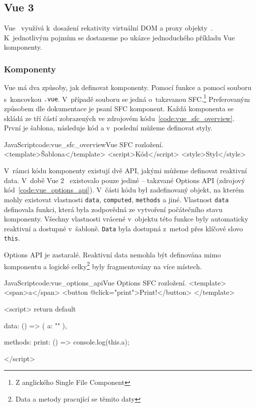 \documentclass[
  master,
  program=ainf,
  printversion,
  tables=false,
  sourcecodes,
  glossaries,
  index
]{kidiplom}
\begin{document}
\subsection{Vue 3}
Vue~\cite{vue} využívá k~dosažení rekativity virtuální DOM a proxy objekty~\cite{proxy}. K~jednotlivým
pojmům se dostaneme po ukázce jednoduchého příkladu Vue komponenty.

\subsubsection{Komponenty}
Vue má dva způsoby, jak definovat komponenty. Pomocí funkce a pomocí souboru 
s~koncovkou {\tt .vue}. V~případě souboru se jedná o~takzvanou SFC.\footnote{Z anglického Single File Component}
Preferovaným způsobem dle dokumentace je psaní SFC komponent. Každá komponenta se skládá ze tří částí
zobrazených ve zdrojovém kódu~\ref{code:vue_sfc_overview}. První je šablona,
následuje kód a v~poslední můžeme definovat styly.

\begin{kicode}{JavaScript}{code:vue_sfc_overview}{Vue SFC rozložení.}
  <template>Šablona</template>
  <script>Kód</script>
  <style>Styl</style>
\end{kicode}

V~rámci kódu komponenty existují dvě API, jakými můžeme definovat reaktivní
data. V~době Vue 2~\cite{vue2} existovalo pouze jediné -- takzvané Options API (zdrojový kód~\ref{code:vue_options_api}). V~části kódu
byl zadefinovaný objekt, na kterém mohly existovat vlastnosti {\tt data}, {\tt computed},
{\tt methods} a jiné. Vlastnost {\tt data} definovala funkci, která byla zodpovědná ze
vytvoření počátečního stavu komponenty. Všechny vlastnosti vrácené v~objektu
této funkce byly automaticky reaktivní a dostupné v~šabloně. {\tt Data} byla dostupná
z~metod přes klíčové slovo {\tt this}.

Options API je zastaralé. Reaktivní data nemohla být definována mimo komponentu
a logické celky\footnote{Data a metody pracující se těmito daty} byly 
fragmentovány na více místech. 

  \begin{kicode}{JavaScript}{code:vue_options_api}{Vue Options SFC rozložení.}
    <template>
      <span>{{a}}</span>
      <button @click="print">Print!</button>
    </template>
  
    <script>
      return default {
        data: () => ({
          a: ""
        }),
  
        methods: {
          print: () => {
            console.log(this.a);
          }
        }
      }
    </script>
  \end{kicode}
\end{document}
